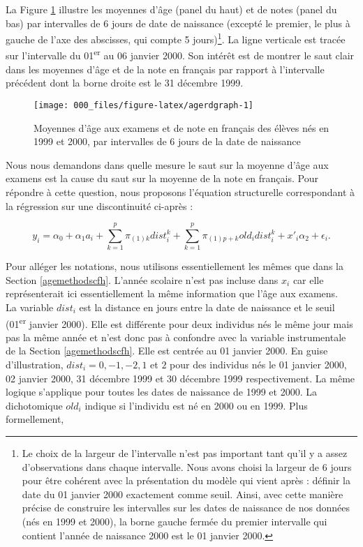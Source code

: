 \documentclass[
]{book}
\begin{document}
\hfill\break
La Figure \ref{fig:agerdgraph} illustre les moyennes d'âge (panel du haut) et de notes (panel du bas) par intervalles de 6 jours de date de naissance (excepté le premier, le plus à gauche de l'axe des abscisses, qui compte 5 jours)\footnote{Le choix de la largeur de l'intervalle n'est pas important tant qu'il y a assez d'observations dans chaque intervalle. Nous avons choisi la largeur de 6 jours pour être cohérent avec la présentation du modèle qui vient après : définir la date du 01 janvier 2000 exactement comme seuil. Ainsi, avec cette manière précise de construire les intervalles sur les dates de naissance de nos données (nés en 1999 et 2000), la borne gauche fermée du premier intervalle qui contient l'année de naissance 2000 est le 01 janvier 2000.}. La ligne verticale est tracée sur l'intervalle du 01\textsuperscript{er} au 06 janvier 2000. Son intérêt est de montrer le saut clair dans les moyennes d'âge et de la note en français par rapport à l'intervalle précédent dont la borne droite est le 31 décembre 1999.

\begin{figure}[H]

{\centering \texttt{[image: 000\_files/figure-latex/agerdgraph-1]} 

}

\caption{Moyennes d'âge aux examens et de note en français des élèves nés en 1999 et 2000, par intervalles de 6 jours de la date de naissance}\label{fig:agerdgraph}
\end{figure}

\quad Nous nous demandons dans quelle mesure le saut sur la moyenne d'âge aux examens est la cause du saut sur la moyenne de la note en français. Pour répondre à cette question, nous proposons l'équation structurelle correspondant à la régression sur une discontinuité ci-après :

\begin{equation}
\label{eq:ageolsrd}
y_i = \alpha_0 + \alpha_1 a_i + \sum_{k = 1}^p \pi_{(1)k} dist_i^k + \sum_{k = 1}^p \pi_{(1)p+k} old_i dist_i^k + x'_i \alpha_2 + \epsilon_i.
\end{equation}

Pour alléger les notations, nous utilisons essentiellement les mêmes que dans la Section \ref{agemethodscfh}. L'année scolaire n'est pas incluse dans \(x_i\) car elle représenterait ici essentiellement la même information que l'âge aux examens.\\
La variable \(dist_i\) est la distance en jours entre la date de naissance et le seuil (01\textsuperscript{er} janvier 2000). Elle est différente pour deux individus nés le même jour mais pas la même année et n'est donc pas à confondre avec la variable instrumentale de la Section \ref{agemethodscfh}. Elle est centrée au 01 janvier 2000. En guise d'illustration, \(dist_i = 0, - 1, - 2, 1\) et \(2\) pour des individus nés le 01 janvier 2000, 02 janvier 2000, 31 décembre 1999 et 30 décembre 1999 respectivement. La même logique s'applique pour toutes les dates de naissance de 1999 et 2000. La dichotomique \(old_i\) indique si l'individu est né en 2000 ou en 1999. Plus formellement,
\end{document}
